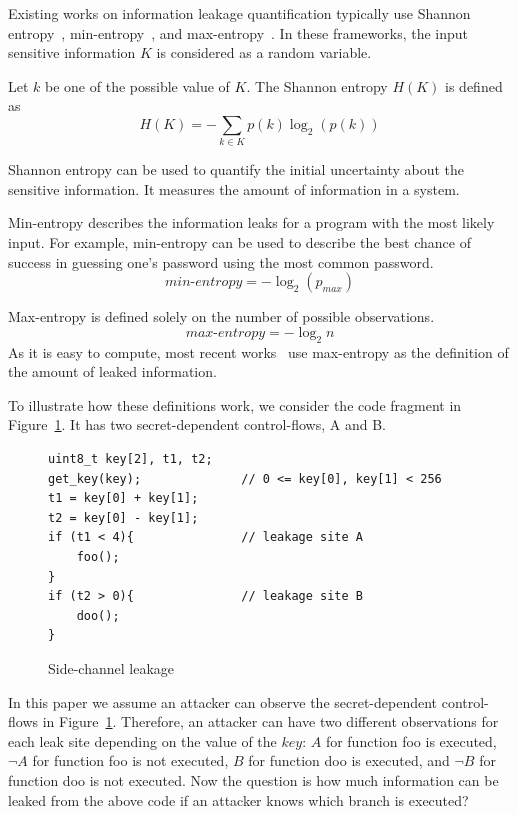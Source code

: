 Existing works on information leakage quantification typically use Shannon
entropy~\cite{clark2007static,Wichelmann:2018:MFF:3274694.3274741},
min-entropy~\cite{10.1007/978-3-642-00596-1_21}, and max-entropy~\cite{182946,
Doychev:2017:RAS:3062341.3062388}. In these frameworks, the input sensitive
information $K$ is considered as a random variable.

Let $k$ be one of the possible
value of $K$. The Shannon entropy $H(K)$ is defined as
\begin{displaymath}
    H(K) = - \sum_{k {\in} K}p(k)\log_2(p(k))
\end{displaymath}

Shannon entropy can be used to quantify the initial uncertainty about the
sensitive information. It measures the amount of information in a system.

Min-entropy describes the information leaks for a program with the most likely input.
For example, min-entropy can be used to describe the
best chance of success in guessing one's password using the
most common password. %
\begin{displaymath}
    \mathit{min\text{-}entropy} = - \log_2(p_{\mathit{max}})
\end{displaymath}

Max-entropy is defined solely on the number of possible observations.
\begin{displaymath}
    \mathit{max\text{-}entropy} = -\log_2{n}
\end{displaymath}
As it is easy to compute, most recent works~\cite{182946,Doychev:2017:RAS:3062341.3062388} use max-entropy as the definition of
the amount of leaked information.

To illustrate how these definitions work, we consider the code
fragment in Figure~\ref{fig:side-channel}. It has two secret-dependent
control-flows, A and B.

\begin{figure}[h!]
    \centering
    \begin{lstlisting}[xleftmargin=.2\textwidth, xrightmargin=.2\textwidth]
uint8_t key[2], t1, t2;
get_key(key);              // 0 <= key[0], key[1] < 256
t1 = key[0] + key[1];
t2 = key[0] - key[1];
if (t1 < 4){               // leakage site A
    foo();    
}                          
if (t2 > 0){               // leakage site B     
    doo();    
}                          
\end{lstlisting}
    \vspace*{-1pt}
    \caption{Side-channel leakage}
    \label{fig:side-channel}
\end{figure}
In this paper we assume an attacker can observe the secret-dependent control-flows in Figure~\ref{fig:side-channel}.
Therefore, an attacker can have two different observations for each leak site
depending on the value of the $\mathit{key}$: $A$ for function \textsf{foo} is executed,
$\neg A$ for function \textsf{foo} is not executed, $B$ for function \textsf{doo} is
executed, and $\neg B$ for function \textsf{doo} is not executed. Now the
question is how much information can be leaked from the above code if an
attacker knows which branch is executed?

